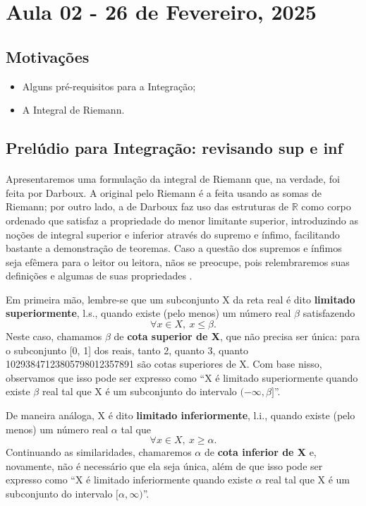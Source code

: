 \documentclass[../analysisII_notes.tex]{subfiles}
\begin{document}
\section{Aula 02 - 26 de Fevereiro, 2025}
\subsection{Motivações}
\begin{itemize}
	\item Alguns pré-requisitos para a Integração;
	\item A Integral de Riemann.
\end{itemize}
\subsection{Prelúdio para Integração: revisando sup e inf}
\paragraph{} Apresentaremos uma formulação da integral de Riemann que, na verdade, foi feita por Darboux. A original pelo Riemann é a feita usando as somas de Riemann;
por outro lado, a de Darboux faz uso das estruturas de \(\mathbb{R}\) como corpo ordenado que satisfaz a propriedade do menor limitante superior, introduzindo as noções
de integral superior e inferior através do supremo e ínfimo, facilitando bastante a demonstração de teoremas. Caso a questão dos supremos e ínfimos seja efêmera para o leitor ou leitora,
nãos se preocupe, pois relembraremos suas definições e algumas de suas propriedades .

Em primeira mão, lembre-se que um subconjunto X da reta real é dito \textbf{limitado superiormente}, l.s., quando existe (pelo menos) um número real \(\beta \) satisfazendo
\[
	\forall x\in X, \: x\leq \beta .
\]
Neste caso, chamamos \(\beta \) de \textbf{cota superior de X}, que não precisa ser única: para o subconjunto [0, 1] dos reais, tanto 2, quanto 3, quanto 10293847123805798012357891 são cotas superiores de X.
Com base nisso, observamos que isso pode ser expresso como ``X é limitado superiormente quando existe \(\beta \) real tal que X é um subconjunto do intervalo \((-\infty, \beta]\)''.

De maneira análoga, X é dito \textbf{limitado inferiormente}, l.i., quando existe (pelo menos) um número real \(\alpha \) tal que
\[
	\forall x\in X, \: x\geq \alpha .
\]
Continuando as similaridades, chamaremos \(\alpha \) de \textbf{cota inferior de X} e, novamente, não é necessário que ela seja única, além de que
isso pode ser expresso como ``X é limitado inferiormente quando existe \(\alpha  \) real tal que X é um subconjunto do intervalo \([\alpha , \infty)\)''.
\end{document}
